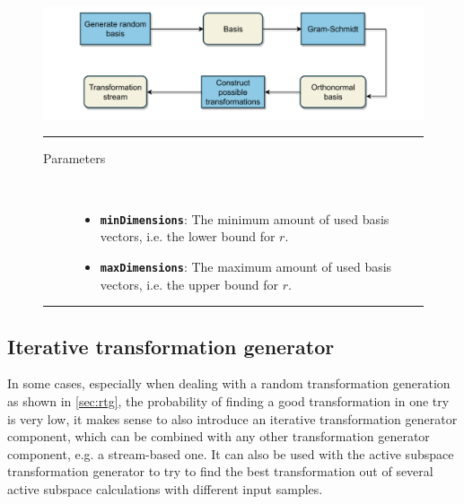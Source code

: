 \documentclass[
  a4paper,  %
  twoside,  %
  bibliography=totoc,
  headsepline,
  cleardoublepage=empty,
  parskip=half,
  draft=false
]{scrbook}
\newcommand{\delimit}{{\color{silver}\noindent\rule{\textwidth}{1pt}}}
\begin{document}
\begin{mdframed}[style=style,frametitle={Transformation stream generator (random)}]
\begin{figure}[H]

\vspace{5px}
\includegraphics[width=\textwidth]{graphics/TransformationStreamGen_Random.pdf}

\delimit
\begin{description}
\item[Parameters] {~ \begin{itemize}[\indent{}]
\item \texttt{\textbf{minDimensions}}: The minimum amount of used basis vectors, i.e. the lower bound for $r$.
\item \texttt{\textbf{maxDimensions}}: The maximum amount of used basis vectors, i.e. the upper bound for $r$.
\end{itemize}}
\end{description}
\delimit
{}
\label{fig:rtsg}
\end{figure}
\end{mdframed}

\newpage

\subsection {Iterative transformation generator}

In some cases, especially when dealing with a random transformation generation as shown in \cref{sec:rtg}, the probability of finding a good transformation in one try is very low, it makes sense to also introduce an iterative transformation generator component, which can be combined with any other transformation generator component, e.g. a stream-based one.
It can also be used with the active subspace transformation generator to try to find the best transformation out of several active subspace calculations with different input samples.
\end{document}
